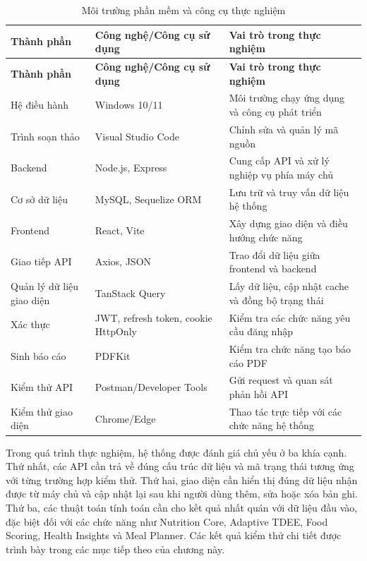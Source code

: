 \documentclass[12pt, a4paper]{report}
\begin{document}
\begin{longtable}{|>{\raggedright\arraybackslash}p{4cm}|>{\raggedright\arraybackslash}p{4cm}|p{7cm}|}
\caption{Môi trường phần mềm và công cụ thực nghiệm}
\label{tab:moi_truong_thuc_nghiem} \\
\hline
\textbf{Thành phần} & \textbf{Công nghệ/Công cụ sử dụng} & \textbf{Vai trò trong thực nghiệm} \\
\hline
\endfirsthead
\hline
\textbf{Thành phần} & \textbf{Công nghệ/Công cụ sử dụng} & \textbf{Vai trò trong thực nghiệm} \\
\hline
\endhead

Hệ điều hành & Windows 10/11 & Môi trường chạy ứng dụng và công cụ phát triển \\
\hline
Trình soạn thảo & Visual Studio Code & Chỉnh sửa và quản lý mã nguồn \\
\hline
Backend & Node.js, Express & Cung cấp API và xử lý nghiệp vụ phía máy chủ \\
\hline
Cơ sở dữ liệu & MySQL, Sequelize ORM & Lưu trữ và truy vấn dữ liệu hệ thống \\
\hline
Frontend & React, Vite & Xây dựng giao diện và điều hướng chức năng \\
\hline
Giao tiếp API & Axios, JSON & Trao đổi dữ liệu giữa frontend và backend \\
\hline
Quản lý dữ liệu giao diện & TanStack Query & Lấy dữ liệu, cập nhật cache và đồng bộ trạng thái \\
\hline
Xác thực & JWT, refresh token, cookie HttpOnly & Kiểm tra các chức năng yêu cầu đăng nhập \\
\hline
Sinh báo cáo & PDFKit & Kiểm tra chức năng tạo báo cáo PDF \\
\hline
Kiểm thử API & Postman/Developer Tools & Gửi request và quan sát phản hồi API \\
\hline
Kiểm thử giao diện & Chrome/Edge & Thao tác trực tiếp với các chức năng hệ thống \\
\hline
\end{longtable}

Trong quá trình thực nghiệm, hệ thống được đánh giá chủ yếu ở ba khía cạnh. Thứ nhất, các API cần trả về đúng cấu trúc dữ liệu và mã trạng thái tương ứng với từng trường hợp kiểm thử. Thứ hai, giao diện cần hiển thị đúng dữ liệu nhận được từ máy chủ và cập nhật lại sau khi người dùng thêm, sửa hoặc xóa bản ghi. Thứ ba, các thuật toán tính toán cần cho kết quả nhất quán với dữ liệu đầu vào, đặc biệt đối với các chức năng như Nutrition Core, Adaptive TDEE, Food Scoring, Health Insights và Meal Planner. Các kết quả kiểm thử chi tiết được trình bày trong các mục tiếp theo của chương này.
\end{document}
